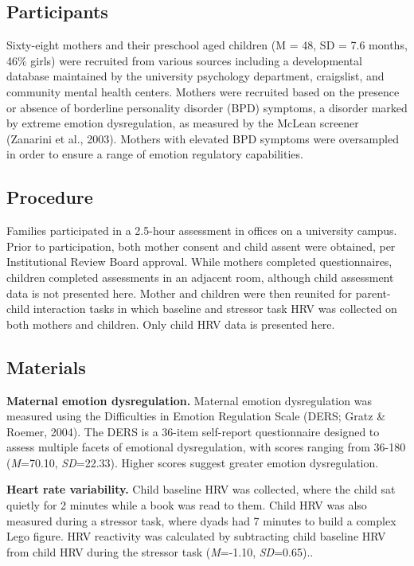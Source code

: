 \documentclass[man]{apa6}
\begin{document}
\subsection{Participants}\label{participants}

Sixty-eight mothers and their preschool aged children (M = 48, SD = 7.6
months, 46\% girls) were recruited from various sources including a
developmental database maintained by the university psychology
department, craigslist, and community mental health centers. Mothers
were recruited based on the presence or absence of borderline
personality disorder (BPD) symptoms, a disorder marked by extreme
emotion dysregulation, as measured by the McLean screener (Zanarini et
al., 2003). Mothers with elevated BPD symptoms were oversampled in order
to ensure a range of emotion regulatory capabilities.

\subsection{Procedure}\label{procedure}

Families participated in a 2.5-hour assessment in offices on a
university campus. Prior to participation, both mother consent and child
assent were obtained, per Institutional Review Board approval. While
mothers completed questionnaires, children completed assessments in an
adjacent room, although child assessment data is not presented here.
Mother and children were then reunited for parent-child interaction
tasks in which baseline and stressor task HRV was collected on both
mothers and children. Only child HRV data is presented here.

\subsection{Materials}\label{materials}

\textbf{Maternal emotion dysregulation.} Maternal emotion dysregulation
was measured using the Difficulties in Emotion Regulation Scale (DERS;
Gratz \& Roemer, 2004). The DERS is a 36-item self-report questionnaire
designed to assess multiple facets of emotional dysregulation, with
scores ranging from 36-180 (\emph{M}=70.10, \emph{SD}=22.33). Higher
scores suggest greater emotion dysregulation.

\textbf{Heart rate variability.} Child baseline HRV was collected, where
the child sat quietly for 2 minutes while a book was read to them. Child
HRV was also measured during a stressor task, where dyads had 7 minutes
to build a complex Lego figure. HRV reactivity was calculated by
subtracting child baseline HRV from child HRV during the stressor task
(\emph{M}=-1.10, \emph{SD}=0.65)..
\end{document}

